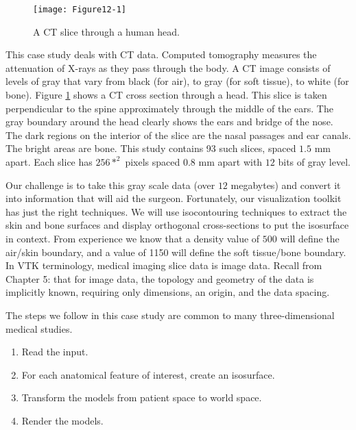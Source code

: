 \begin{figure}[!htb]
	\centering
	\texttt{[image: Figure12-1]}
	\caption{A CT slice through a human head.}
	\label{fig:Figure12-1}
\end{figure}

This case study deals with CT data. Computed tomography measures the attenuation of X-rays as they pass through the body. A CT image consists of levels of gray that vary from black (for air), to gray (for soft tissue), to white (for bone).  Figure \ref{fig:Figure12-1} shows a CT cross section through a head. This slice is taken perpendicular to the spine approximately through the middle of the ears.  The gray boundary around the head clearly shows the ears and bridge of the nose. The dark regions on the interior of the slice are the nasal passages and ear canals. The bright areas are bone. This study contains 93 such slices, spaced $1.5$ mm apart. Each slice has $256*^2$ pixels spaced 0.8 mm apart with $12$ bits of gray level.

Our challenge is to take this gray scale data (over $12$ megabytes) and convert it into information that will aid the surgeon. Fortunately, our visualization toolkit has just the right techniques. We will use isocontouring techniques to extract the skin and bone surfaces and display orthogonal cross-sections to put the isosurface in context. From experience we know that a density value of $500$ will define the air/skin boundary, and a value of 1150 will define the soft tissue/bone boundary. In VTK terminology, medical imaging slice data is image data. Recall from Chapter 5:  that for image data, the topology and geometry of the data is implicitly known, requiring only dimensions, an origin, and the data spacing.

The steps we follow in this case study are common to many
three-dimensional medical studies.
\begin{enumerate}

    \item Read the input.

    \item For each anatomical feature of interest, create an isosurface.

    \item Transform the models from patient space to world space.

    \item Render the models.

\end{enumerate}


